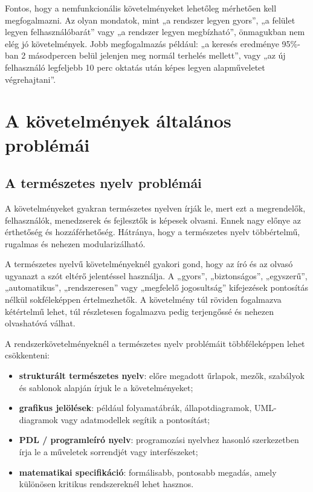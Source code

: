 Fontos, hogy a nemfunkcionális követelményeket lehetőleg mérhetően kell megfogalmazni. Az olyan mondatok, mint „a rendszer legyen gyors”, „a felület legyen felhasználóbarát” vagy „a rendszer legyen megbízható”, önmagukban nem elég jó követelmények. Jobb megfogalmazás például: „a keresés eredménye 95\%-ban 2 másodpercen belül jelenjen meg normál terhelés mellett”, vagy „az új felhasználó legfeljebb 10 perc oktatás után képes legyen alapműveletet végrehajtani”.

\section{A követelmények általános problémái}

\subsection{A természetes nyelv problémái}

A követelményeket gyakran természetes nyelven írják le, mert ezt a megrendelők, felhasználók, menedzserek és fejlesztők is képesek olvasni. Ennek nagy előnye az érthetőség és hozzáférhetőség. Hátránya, hogy a természetes nyelv többértelmű, rugalmas és nehezen modularizálható.

A természetes nyelvű követelményeknél gyakori gond, hogy az író és az olvasó ugyanazt a szót eltérő jelentéssel használja. A „gyors”, „biztonságos”, „egyszerű”, „automatikus”, „rendszeresen” vagy „megfelelő jogosultság” kifejezések pontosítás nélkül sokféleképpen értelmezhetők. A követelmény túl röviden fogalmazva kétértelmű lehet, túl részletesen fogalmazva pedig terjengőssé és nehezen olvashatóvá válhat.

A rendszerkövetelményeknél a természetes nyelv problémáit többféleképpen lehet csökkenteni:

\begin{itemize}
  \item \textbf{strukturált természetes nyelv}: előre megadott űrlapok, mezők, szabályok és sablonok alapján írjuk le a követelményeket;
  \item \textbf{grafikus jelölések}: például folyamatábrák, állapotdiagramok, UML-diagramok vagy adatmodellek segítik a pontosítást;
  \item \textbf{PDL / programleíró nyelv}: programozási nyelvhez hasonló szerkezetben írja le a műveletek sorrendjét vagy interfészeket;
  \item \textbf{matematikai specifikáció}: formálisabb, pontosabb megadás, amely különösen kritikus rendszereknél lehet hasznos.
\end{itemize}

